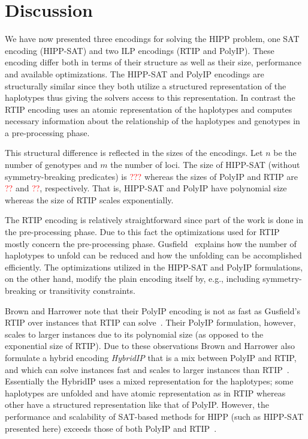 \documentclass[12pt,a4paper]{article}
\newcommand{\TODO}[1]{\textcolor{red}{#1}}
\begin{document}
\section{Discussion}

We have now presented three encodings for solving the HIPP problem, one SAT encoding (HIPP-SAT) and two ILP encodings (RTIP and PolyIP).
These encoding differ both in terms of their structure as well as their size, performance and available optimizations.
The HIPP-SAT and PolyIP encodings are structurally similar since they both utilize a structured representation of the haplotypes thus giving the solvers access to this representation.
In contrast the RTIP encoding uses an atomic representation of the haplotypes and computes necessary information about the relationship of the haplotypes and genotypes in a pre-processing phase.

This structural difference is reflected in the sizes of the encodings.
Let $n$ be the number of genotypes and $m$ the number of loci.
The size of HIPP-SAT (without symmetry-breaking predicates) is \TODO{???} whereas the sizes of PolyIP and RTIP are \TODO{??} and \TODO{??}, respectively.
That is, HIPP-SAT and PolyIP have polynomial size whereas the size of RTIP scales exponentially.

The RTIP encoding is relatively straightforward since part of the work is done in the pre-processing phase.
Due to this fact the optimizations used for RTIP mostly concern the pre-processing phase.
Gusfield~\cite{DBLP:conf/cpm/Gusfield03} explains how the number of haplotypes to unfold can be reduced and how the unfolding can be accomplished efficiently.
The optimizations utilized in the HIPP-SAT and PolyIP formulations, on the other hand, modify the plain encoding itself by, e.g., including symmetry-breaking or transitivity constraints.

Brown and Harrower note that their PolyIP encoding is not as fast as Gusfield's RTIP over instances that RTIP can solve~\cite{DBLP:journals/tcbb/BrownH06}.
Their PolyIP formulation, however, scales to larger instances due to its polynomial size (as opposed to the exponential size of RTIP).
Due to these observations Brown and Harrower also formulate a hybrid encoding \emph{HybridIP} that is a mix between PolyIP and RTIP, and which can solve instances fast and scales to larger instances than RTIP~\cite{DBLP:conf/cpm/Gusfield03}.
Essentially the HybridIP uses a mixed representation for the haplotypes; 
some haplotypes are unfolded and have atomic representation as in RTIP whereas other have a structured representation like that of PolyIP.
However, the performance and scalability of SAT-based methods for HIPP (such as HIPP-SAT presented here) exceeds those of both PolyIP and RTIP~\cite{DBLP:journals/jcb/GracaLMO10}.
\end{document}
